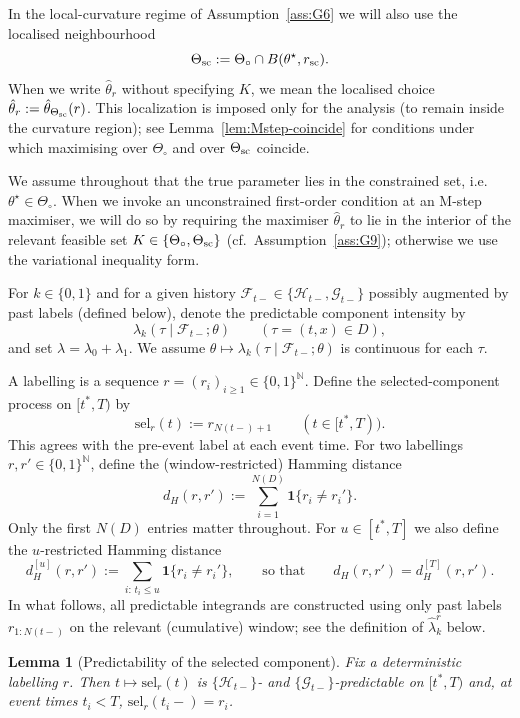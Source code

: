 \documentclass{statsoc}
\newtheorem{lemma}[lemma]{Lemma}
\newcommand{\1}{\mathbbm{1}}
\newcommand{\bbN}{\mathbb{N}}
\begin{document}
In the local-curvature regime of Assumption~\ref{ass:G6} we will also use the localised neighbourhood
\[
\Theta_{\rm sc}:=\Theta_\circ\cap B(\theta^\star,r_{\rm sc}).
\]
When we write $\hat\theta_r$ without specifying $K$, we mean the localised choice
$\hat\theta_r:=\hat\theta_{\Theta_{\rm sc}}(r)$. This localization is imposed only for the analysis (to remain inside the curvature region); see Lemma~\ref{lem:Mstep-coincide} for conditions under which maximising over $\Theta_\circ$ and over $\Theta_{\rm sc}$ coincide.

We assume throughout that the true parameter lies in the constrained set, i.e.\ $\theta^\star\in\Theta_\circ$. When we invoke an unconstrained first-order condition at an M-step maximiser, we will do so by requiring the maximiser $\hat\theta_r$ to lie in the interior of the relevant feasible set $K\in\{\Theta_\circ,\Theta_{\rm sc}\}$ (cf.\ Assumption~\ref{ass:G9}); otherwise we use the variational inequality form.

For $k\in\{0,1\}$ and for a given history $\mathcal F_{t-}\in\{\mathcal H_{t-},\mathcal G_{t-}\}$ possibly augmented by past labels (defined below), denote the predictable component intensity by
\[
\lambda_k(\tau\mid \mathcal F_{t-};\theta)\qquad(\tau=(t,x)\in D),
\]
and set $\lambda=\lambda_0+\lambda_1$. We assume $\theta\mapsto \lambda_k(\tau\mid \mathcal F_{t-};\theta)$ is continuous for each $\tau$.

A labelling is a sequence $r=(r_i)_{i\ge 1}\in\{0,1\}^{\bbN}$. Define the selected-component process on $[t^\ast,T)$ by
\begin{equation}\label{eq:sel-def}
\mathrm{sel}_r(t):=r_{N(t-)+1}\qquad (t\in[t^\ast,T)).
\end{equation}
This agrees with the pre-event label at each event time. For two labellings $r,r'\in\{0,1\}^{\bbN}$, define the (window-restricted) Hamming distance
\[
d_H(r,r'):=\sum_{i=1}^{N(D)} \mathbf 1\{r_i\neq r_i'\}.
\]
Only the first $N(D)$ entries matter throughout. For $u\in[t^\ast,T]$ we also define the
$u$-restricted Hamming distance
\[
d_H^{[u]}(r,r'):=\sum_{i:\,t_i\le u} \mathbf 1\{r_i\neq r_i'\},
\qquad\text{so that}\qquad
d_H(r,r')=d_H^{[T]}(r,r').
\]
In what follows, all predictable integrands are constructed using only past labels $r_{1:N(t-)}$ on the relevant (cumulative) window; see the definition of $\widehat\lambda_k^r$ below.

\begin{lemma}[Predictability of the selected component]\label{lem:sel-predictable}
Fix a deterministic labelling $r$. Then $t\mapsto \mathrm{sel}_r(t)$ is $\{\mathcal H_{t-}\}$- and $\{\mathcal G_{t-}\}$-predictable on $[t^\ast,T)$ and, at event times $t_i<T$, $\mathrm{sel}_r(t_i-)=r_i$.
\end{lemma}
\end{document}
